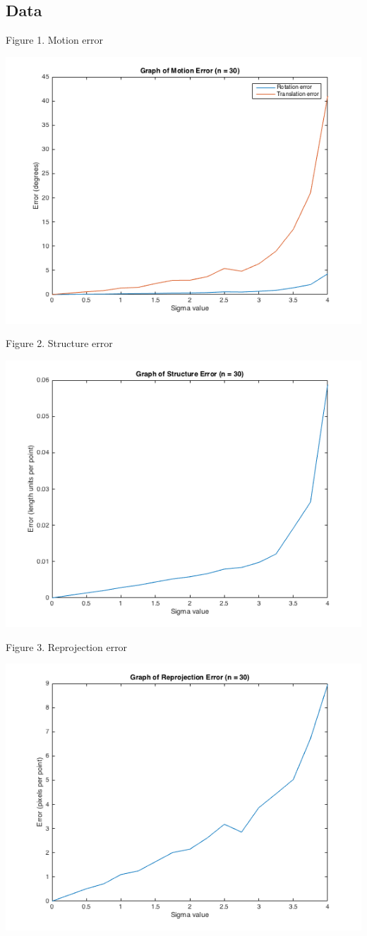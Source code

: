 \documentclass{article}
\begin{document}
\newpage
\subsection{Data}
\begin{center}
	\begin{center}Figure 1. Motion error\end{center}
	\includegraphics[width=.7\textwidth,keepaspectratio]{motion_error.png}
	\begin{center}Figure 2. Structure error\end{center}
	\includegraphics[width=.7\textwidth,keepaspectratio]{structure_error.png}
	\newpage

	\begin{center}Figure 3. Reprojection error\end{center}
	\includegraphics[width=.7\textwidth,keepaspectratio]{reprojection_error.png}


\end{center}
\end{document}
